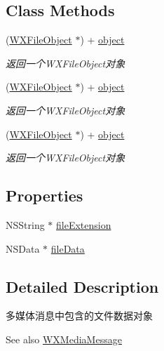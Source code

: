 \subsection*{Class Methods}
\begin{DoxyCompactItemize}
\item 
(\mbox{\hyperlink{interface_w_x_file_object}{W\+X\+File\+Object}} $\ast$) + \mbox{\hyperlink{interface_w_x_file_object_a3372d1562694c571a0627e7c97f47fcc}{object}}
\begin{DoxyCompactList}\small\item\em 返回一个\+W\+X\+File\+Object对象 \end{DoxyCompactList}\item 
(\mbox{\hyperlink{interface_w_x_file_object}{W\+X\+File\+Object}} $\ast$) + \mbox{\hyperlink{interface_w_x_file_object_a3372d1562694c571a0627e7c97f47fcc}{object}}
\begin{DoxyCompactList}\small\item\em 返回一个\+W\+X\+File\+Object对象 \end{DoxyCompactList}\item 
(\mbox{\hyperlink{interface_w_x_file_object}{W\+X\+File\+Object}} $\ast$) + \mbox{\hyperlink{interface_w_x_file_object_a3372d1562694c571a0627e7c97f47fcc}{object}}
\begin{DoxyCompactList}\small\item\em 返回一个\+W\+X\+File\+Object对象 \end{DoxyCompactList}\end{DoxyCompactItemize}
\subsection*{Properties}
\begin{DoxyCompactItemize}
\item 
N\+S\+String $\ast$ \mbox{\hyperlink{interface_w_x_file_object_aecddee8a8a0e984f9553dc9afaa5d3cc}{file\+Extension}}
\item 
N\+S\+Data $\ast$ \mbox{\hyperlink{interface_w_x_file_object_acf980e52f2f5e14ead6003334d20067b}{file\+Data}}
\end{DoxyCompactItemize}


\subsection{Detailed Description}
多媒体消息中包含的文件数据对象 

\begin{DoxySeeAlso}{See also}
\mbox{\hyperlink{interface_w_x_media_message}{W\+X\+Media\+Message}} 
\end{DoxySeeAlso}


